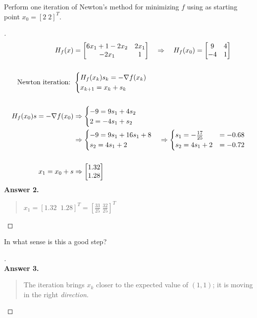 \documentclass[12pt]{article}
\newenvironment{exercise}[2][Exercise]{\begin{trivlist}
\item[\hskip \labelsep {\bfseries #1}\hskip \labelsep {\bfseries #2.}]}{\end{trivlist}}
\begin{document}
\pagebreak
\begin{exercise}{2}
	Perform one iteration of Newton's method for minimizing $f$ using as starting point $x_0 = [2 \; 2]^T$.
\end{exercise} \vspace{-10mm}
\begin{proof}[]
	\begin{align*}
		H_f(x) &= \begin{bmatrix} 6x_1 + 1 - 2x_2 & 2x_1 \\ -2x_1 & 1 \end{bmatrix} \quad \Rightarrow \quad
		H_f(x_0) = \begin{bmatrix} 9 & 4 \\ -4 & 1 \end{bmatrix} \\[15pt]
		\textnormal{Newton iteration: } &\begin{cases} H_f(x_k) s_k = - \nabla f(x_k) \\ x_{k+1} = x_k + s_k \end{cases} \\[15pt]
		H_f(x_0) s = - \nabla f(x_0) &\Rightarrow \begin{cases} -9 = 9s_1 + 4s_2 \\ 2 = -4s_1 + s_2 \end{cases} \\
		&\Rightarrow \begin{cases} -9 = 9s_1 + 16s_1 + 8 \\ s_2 = 4s_1 + 2 \end{cases}
			\Rightarrow \begin{cases} s_1 = -\frac{17}{25} &= -0.68 \\ s_2 = 4s_1 + 2 &= -0.72 \end{cases} \\[15pt]
		x_{1} = x_0 + s &\Rightarrow \begin{bmatrix} 1.32 \\ 1.28 \end{bmatrix}
	\end{align*}
	\textbf{Answer 2.} \vspace{-7mm} \\
	\begin{quote}
		$x_1 = [1.32 \; \; 1.28]^T = [\frac{33}{25} \; \frac{32}{25}]^T$
	\end{quote}
\end{proof}

\begin{exercise}{3} In what sense is this a good step?
\end{exercise} \vspace{-10mm}
\begin{proof}[] \textnormal{ } \\
	\textbf{Answer 3.} \vspace{-7mm} \\
	\begin{quote}
		The iteration brings $x_k$ closer to the expected value of $(1,1)$; it is moving in the right \textit{direction}.
	\end{quote}
\end{proof}
\end{document}
